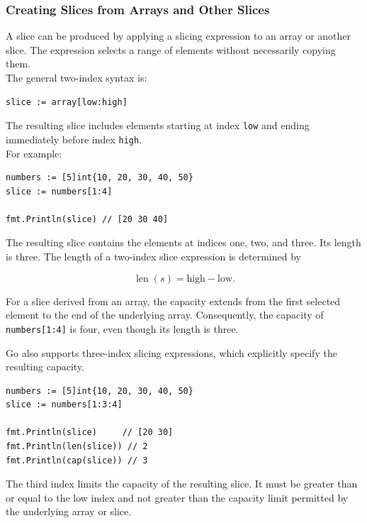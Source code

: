 \subsubsection{Creating Slices from Arrays and Other Slices}

A slice can be produced by applying a slicing expression to an array or another slice. The expression selects a range of elements without necessarily copying them.\\

The general two-index syntax is:

\begin{lstlisting}
slice := array[low:high]
\end{lstlisting}

The resulting slice includes elements starting at index \texttt{low} and ending immediately before index \texttt{high}.\\

For example:

\begin{lstlisting}
numbers := [5]int{10, 20, 30, 40, 50}
slice := numbers[1:4]

fmt.Println(slice) // [20 30 40]
\end{lstlisting}

The resulting slice contains the elements at indices one, two, and three. Its length is three. The length of a two-index slice expression is determined by

\[
\operatorname{len}(s) = \text{high} - \text{low}.
\]

For a slice derived from an array, the capacity extends from the first selected element to the end of the underlying array. Consequently, the capacity of \texttt{numbers[1:4]} is four, even though its length is three.

Go also supports three-index slicing expressions, which explicitly specify the resulting capacity.

\begin{lstlisting}
numbers := [5]int{10, 20, 30, 40, 50}
slice := numbers[1:3:4]

fmt.Println(slice)     // [20 30]
fmt.Println(len(slice)) // 2
fmt.Println(cap(slice)) // 3
\end{lstlisting}

The third index limits the capacity of the resulting slice. It must be greater than or equal to the low index and not greater than the capacity limit permitted by the underlying array or slice.\\

